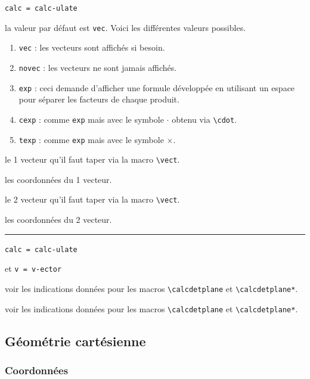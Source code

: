 \documentclass[12pt,a4paper]{book}
\newcommand\env[1]{\texttt{#1}}
\newcommand\macro[1]{\env{\textbackslash{}#1}}
\theoremstyle{definition}
\newcommand\separation{
	\medskip
	\hfill\rule{0.5\textwidth}{0.75pt}\hfill
	\medskip
}
\newcommand\mwhyprefix[2]{%
	\texttt{#1 = #1-#2}%
}
\begin{document}
{{ \hfill \mwhyprefix{calc}{ulate}



\IDoption{} la valeur par défaut est \verb+vec+. Voici les différentes valeurs possibles.
\begin{enumerate}
	\item \verb+vec+ : les vecteurs sont affichés si besoin.

	\item \verb+novec+ : les vecteurs ne sont jamais affichés.

	\item \verb+exp+ : ceci demande d'afficher une formule développée en utilisant un espace pour séparer les facteurs de chaque produit.

	\item \verb+cexp+ : comme \verb+exp+ mais avec le symbole $\cdot$ obtenu via \macro{cdot}.

	\item \verb+texp+ : comme \verb+exp+ mais avec le symbole $\times$.
\end{enumerate}


 le 1\ier{} vecteur qu'il faut taper via la macro \macro{vect}.

 les coordonnées du 1\ier{} vecteur.

 le 2\ieme{} vecteur qu'il faut taper via la macro \macro{vect}.

 les coordonnées du 2\ieme{} vecteur.


\separation


 \hfill \mwhyprefix{calc}{ulate}
                                   et \mwhyprefix{v}{ector}



\IDoption{} voir les indications données pour les macros \macro{calcdetplane} et \macro{calcdetplane*}.

 voir les indications données pour les macros \macro{calcdetplane} et \macro{calcdetplane*}.


\subsection{Géométrie cartésienne}

\subsubsection{Coordonnées} 



}}
\end{document}
